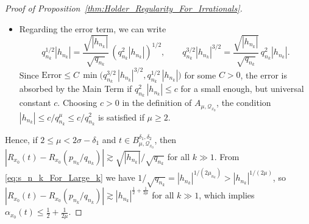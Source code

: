\documentclass[11pt,reqno]{amsart}
\theoremstyle{definition}
\begin{document}
\begin{proof}[Proof of Proposition~\ref{thm:Holder_Regularity_For_Irrationals}]
\begin{itemize}
	\item Regarding the error term, we can write
	\begin{equation}
		 q_{n_k}^{1/2} |h_{n_k}| = \frac{\sqrt{|h_{n_k}|}}{\sqrt{q_{n_k}}} \, (q_{n_k}^2 |h_{n_k}|)^{1/2}, 
		 \qquad 
		 q_{n_k}^{3/2} |h_{n_k}|^{3/2} = \frac{\sqrt{|h_{n_k}|}}{\sqrt{q_{n_k}}} \, q_{n_k}^2 |h_{n_k}|. 	
\end{equation}		
Since $\text{Error} \leq C \, \min \big( q_{n_k}^{3/2}\, |h_{n_k}|^{3/2}, q_{n_k}^{1/2} \, |h_{n_k}| \big) $ for some $C > 0$, 
the error is absorbed by the Main Term if $q_{n_k}^2\, |h_{n_k}| \leq c$ for a small enough, but universal constant $c$. 
Choosing $c>0$ in the definition of $A_{\mu,\mathcal Q_{x_0}}$,  
the condition $|h_{n_k}| \leq c/q_{n_k}^\mu \leq c/q_{n_k}^2$ is satisfied if $\mu \geq 2$. 
\end{itemize}
Hence, if $2 \leq \mu  < 2\sigma - \delta_1$
and $t \in B^{\delta_1,\delta_2}_{\mu,\mathcal Q_{x_0}}$, then
$| R_{x_0}(t) - R_{x_0}( p_{n_k}/q_{n_k} ) | \gtrsim \sqrt{|h_{n_k}|}/\sqrt{q_{n_k}}$ for all $k \gg 1$. 
From \eqref{eq:s_n_k_For_Large_k} we have $1/\sqrt{ q_{n_k} } = |h_{n_k}|^{1/(2\mu_{n_k})} > |h_{n_k}|^{1/(2\mu)}$, so
$| R_{x_0}(t) - R_{x_0}( p_{n_k}/q_{n_k}  ) | \gtrsim |h_{n_k}|^{\frac12 + \frac{1}{2\mu}}$ for all $k \gg 1$, 
which implies $\alpha_{x_0}(t) \leq \frac12 + \frac{1}{2\mu}$.
\end{proof}
\end{document}
